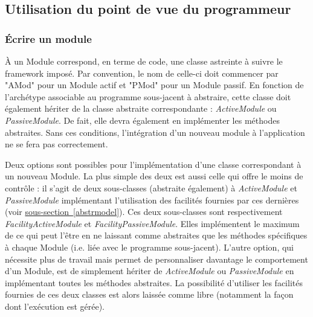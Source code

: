 \documentclass[]{article}
\newcommand{\wordlink}[2]{\hyperref[#1]{#2~\ref{#1}}}
\begin{document}
\subsection{Utilisation du point de vue du programmeur}

\subsubsection{Écrire un module}
\label{writemod}

À un Module correspond, en terme de code, une classe astreinte à suivre le framework imposé. Par convention, le nom de celle-ci doit commencer par "AMod" pour un Module actif et "PMod" pour un Module passif. En fonction de l'archétype associable au programme sous-jacent à abstraire, cette classe doit également hériter de la classe abstraite correspondante : \textit{ActiveModule} ou \textit{PassiveModule}. De fait, elle devra également en implémenter les méthodes abstraites. Sans ces conditions, l'intégration d'un nouveau module à l'application ne se fera pas correctement.\\

\par Deux options sont possibles pour l'implémentation d'une classe correspondant à un nouveau Module. La plus simple des deux est aussi celle qui offre le moins de contrôle : il s'agit de deux sous-classes (abstraite également) à \textit{ActiveModule} et \textit{PassiveModule} implémentant l'utilisation des facilités fournies par ces dernières (voir \wordlink{abstrmodel}{sous-section}). Ces deux sous-classes sont respectivement \textit{FacilityActiveModule} et \textit{FacilityPassiveModule}. Elles implémentent le maximum de ce qui peut l'être en ne laissant comme abstraites que les méthodes spécifiques à chaque Module (i.e. liée avec le programme sous-jacent). L'autre option, qui nécessite plus de travail mais permet de personnaliser davantage le comportement d'un Module, est de simplement hériter de \textit{ActiveModule} ou \textit{PassiveModule} en implémentant toutes les méthodes abstraites. La possibilité d'utiliser les facilités fournies de ces deux classes est alors laissée comme libre (notamment la façon dont l'exécution est gérée).\\ 
\end{document}
